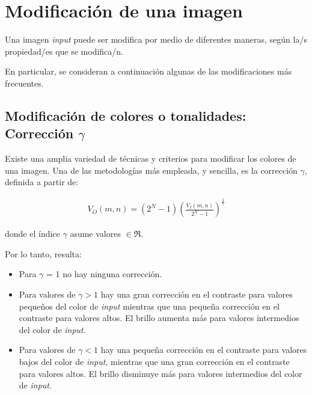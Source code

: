 \section{Modificaci\'on de una imagen}

Una imagen \textit{input} puede ser modifica por medio de diferentes maneras, seg\'un la/s propiedad/es que se modifica/n.
%

%
En particular, se consideran a continuaci\'on algunas de las modificaciones m\'as frecuentes.

\subsection{Modificaci\'on de colores o tonalidades: Correcci\'on $\gamma$}

Existe una amplia variedad de t\'ecnicas y criterios para modificar los colores de una imagen.
%
Una de las metodolog\'ias m\'as empleada, y sencilla, es la correcci\'on $\gamma$, definida a partir de:

\begin{eqnarray}
	V_{O}(m, n) = \left( 2^{N} - 1 \right) \left( \frac{V_{I}(m, n)}{2^{N} -1} \right)^{\frac{1}{\gamma}}
\label{EqXXVI}
\end{eqnarray}

donde el \'indice $\gamma$ asume valores $\in \Re$.
%

%
Por lo tanto, resulta:

\begin{itemize}
 \item Para $\gamma$ = 1 no hay ninguna correcci\'on.
 \item Para valores de $\gamma > 1$ hay una gran correcci\'on en el contraste para valores peque\~nos del color de \textit{input} mientras que una
 peque\~na correcci\'on en el contraste para valores altos. El brillo aumenta m\'as para valores intermedios del color de \textit{input}.
 \item Para valores de $\gamma < 1$ hay una peque\~na correcci\'on en el contraste para valores bajos del color de \textit{input}, mientras que una
 gran correcci\'on en el contraste para valores altos. El brillo disminuye m\'as para valores intermedios del color de \textit{input}.
\end{itemize}


